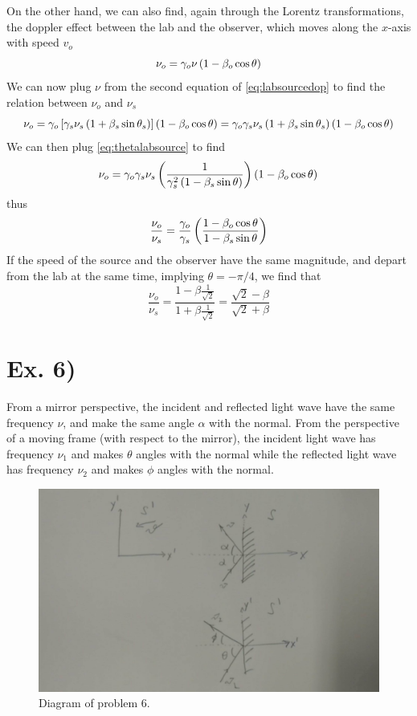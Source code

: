 \documentclass[oneside, 10pt, notitlepage]{book}
\begin{document}
On the other hand, we can also find, again through the Lorentz transformations, the doppler effect between the lab and the observer, which moves along the \(x\)-axis with speed \(v_o\)
\begin{equation}
    \nu_o = \gamma_o \nu \left(1-\beta_o \cos\theta\right)
\end{equation}  
We can now plug \(\nu\) from the second equation of \eqref{eq:labsourcedop} to find the relation between \(\nu_o\) and \(\nu_s\)
\begin{equation}
    \nu_o = \gamma_o \left[\gamma_s \nu_s \left(1+\beta_s\sin\theta_s\right)\right]\left(1-\beta_o\cos\theta\right) = \gamma_o\gamma_s \nu_s \left(1+\beta_s\sin\theta_s\right)\left(1-\beta_o \cos\theta\right)
\end{equation}
We can then plug \eqref{eq:thetalabsource} to find 
\begin{equation}
    \nu_o = \gamma_o\gamma_s \nu_s \left(\frac{1}{\gamma_s^2\left(1-\beta_s \sin\theta\right)}\right)\left(1-\beta_o \cos\theta\right)
\end{equation}
thus
\begin{equation}
    \frac{\nu_o}{\nu_s} = \frac{\gamma_o}{\gamma_s} \left(\frac{1-\beta_o \cos\theta}{1-\beta_s \sin\theta}\right)
\end{equation}
If the speed of the source and the observer have the same magnitude, and depart from the lab at the same time, implying \(\theta=-\pi/4\), we find that 
\begin{equation}
    \frac{\nu_o}{\nu_s} = \frac{1-\beta \frac{1}{\sqrt{2}}}{1+\beta \frac{1}{\sqrt{2}}} = \frac{\sqrt{2}-\beta}{\sqrt{2}+\beta}
\end{equation}

\section*{Ex. 6)}

From a mirror perspective, the incident and reflected light wave have the same frequency \(\nu\), and make the same angle \(\alpha\) with the normal. From the perspective of a moving frame (with respect to the mirror), the incident light wave has frequency \(\nu_1\) and makes \(\theta\) angles with the normal while the reflected light wave has frequency \(\nu_2\) and makes \(\phi\) angles with the normal.

\begin{figure}[H]
    \centering
    \includegraphics[width = 0.7 \textwidth]{L13_6}
    \caption{Diagram of problem 6.}
    \label{fig:L13_6}
\end{figure}
\end{document}
